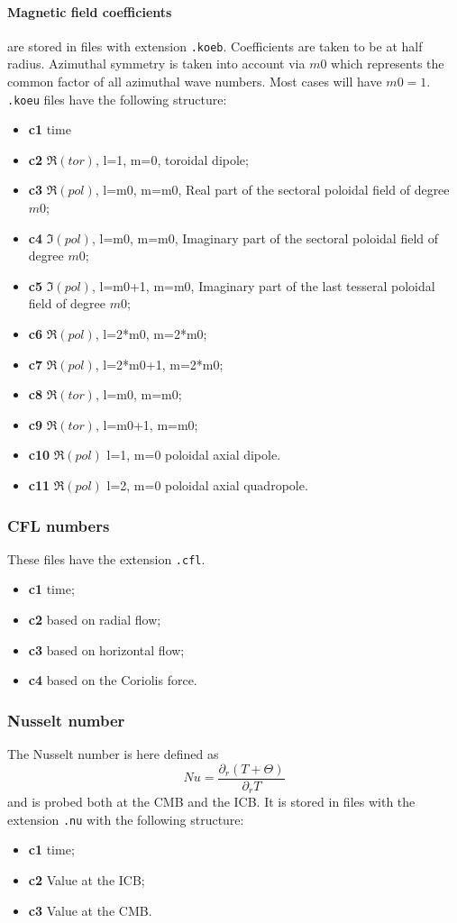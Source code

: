 \documentclass[a4paper,10pt]{book}
\begin{document}
\paragraph{Magnetic field coefficients} are stored in files with extension
\verb|.koeb|. Coefficients are taken to be at half radius. Azimuthal symmetry
is taken into account via $m0$ which represents the common factor of all
azimuthal wave numbers. Most cases will have $m0=1$.
\verb|.koeu| files have the following structure:
\begin{itemize}
 \item{\bf c1} time
 \item{\bf c2} $\Re(tor)$, l=1, m=0, toroidal dipole;
 \item{\bf c3} $\Re(pol)$, l=m0, m=m0, Real part of the sectoral poloidal
field of degree $m0$;
 \item{\bf c4} $\Im(pol)$, l=m0, m=m0, Imaginary part of the sectoral
poloidal field of degree $m0$;
 \item{\bf c5} $\Im(pol)$, l=m0+1, m=m0, Imaginary part of the last tesseral
poloidal field of degree $m0$;
 \item{\bf c6} $\Re(pol)$, l=2*m0, m=2*m0;
 \item{\bf c7} $\Re(pol)$, l=2*m0+1, m=2*m0;
 \item{\bf c8} $\Re(tor)$, l=m0, m=m0;
 \item{\bf c9} $\Re(tor)$, l=m0+1, m=m0;
 \item{\bf c10} $\Re(pol)$ l=1, m=0 poloidal axial dipole.
 \item{\bf c11} $\Re(pol)$ l=2, m=0 poloidal axial quadropole.
\end{itemize}

\subsubsection{CFL numbers}
These files have the extension \verb|.cfl|.
\begin{itemize}
 \item{\bf c1} time;
 \item{\bf c2} based on radial flow;
 \item{\bf c3} based on horizontal flow;
 \item{\bf c4} based on the Coriolis force.
\end{itemize}

\subsubsection{Nusselt number}
The Nusselt number is here defined as
\begin{equation}
 Nu = \frac{\partial_r (T + \Theta)}{\partial_r T }
\end{equation}
and is probed both at the CMB and the ICB.
It is stored in files with the extension \verb|.nu| with the following
structure:
\begin{itemize}
 \item{\bf c1} time;
 \item{\bf c2} Value at the ICB;
 \item{\bf c3} Value at the CMB.
\end{itemize}
\end{document}
